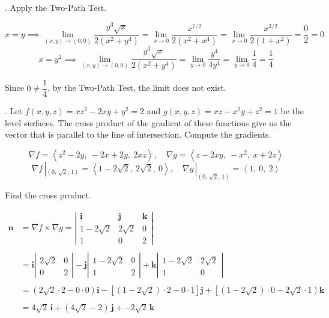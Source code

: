 \documentclass{article}
\begin{document}
\hfill

. Apply the Two-Path Test.

\[x=y\implies\lim_{(x,y)\to(0,0)}\frac{y^3\sqrt x}{2\left(x^2+y^4\right)}=\lim_{x\to0}\frac{x^{7/2}}{2\left(x^2+x^4\right)}=\lim_{x\to0}\frac{x^{3/2}}{2\left(1+x^2\right)}=\frac02=0\]
\[x=y^2\implies\lim_{(x,y)\to(0,0)}\frac{y^3\sqrt x}{2\left(x^2+y^4\right)}=\lim_{y\to0}\frac{y^4}{4y^4}=\lim_{y\to0}\frac14=\frac14\]

\hfill

\noindent Since $0\neq\dfrac14$, by the Two-Path Test, the limit does not exist.

\hfill

. Let $f(x,y,z)=xz^2-2xy+y^2=2$ and $g(x,y,z)=xz-x^2y+z^2=1$ be the level surfaces. The cross product of the gradient of these functions give us the vector that is parallel to the line of intersection. Compute the gradients.

\[\nabla f=\left\langle z^2-2y,\:-2x+2y,\:2xz\right\rangle,\quad \nabla g=\left\langle z-2xy,\:-x^2,\: x+2z\right\rangle\]
\[\nabla f\,|_{\left(0,\,\sqrt2,\,1\right)}=\left\langle1-2\sqrt2,\:2\sqrt2,\:0\right\rangle,\quad \nabla g\,|_{\left(0,\,\sqrt2,\,1\right)}=\left\langle1,\:0,\:2\right\rangle\]

\hfill

\noindent Find the cross product.

\begin{align*}\mathbf{n}&=\nabla f\times \nabla g=\left|\begin{array}{ccc}
\mathbf{i}&\mathbf{j}&\mathbf{k}\\
1-2\sqrt2&2\sqrt2&0\\
1&0&2
\end{array}\right|\\\\&=\mathbf{i}\left|\begin{array}{cc}
2\sqrt2&0\\0&2
\end{array}\right|-\mathbf{j}\left|\begin{array}{cc}
1-2\sqrt2&0\\1&2
\end{array}\right|+\mathbf{k}\left|\begin{array}{cc}
1-2\sqrt2&2\sqrt2\\1&0
\end{array}\right|\\\\&=\left(2\sqrt2\cdot2-0\cdot0\right)\mathbf{i}-\left[\left(1-2\sqrt2\right)\cdot2-0\cdot1\right]\mathbf{j}+\left[\left(1-2\sqrt2\right)\cdot0-2\sqrt2\cdot1\right)\mathbf{k}\\\\&=4\sqrt2\,\mathbf{i}+\left(4\sqrt2-2\right)\,\mathbf{j}+-2\sqrt2\,\mathbf{k}\end{align*}
\end{document}
